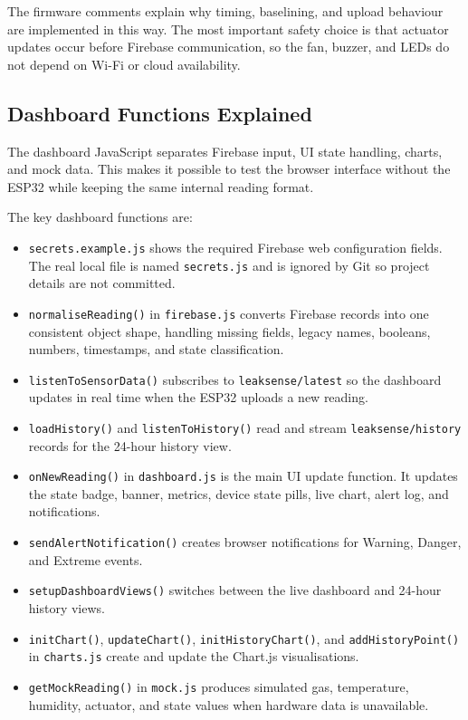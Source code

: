 \documentclass[a4paper,10pt,conference,onecolumn]{IEEEtran}
\begin{document}
The firmware comments explain why timing, baselining, and upload behaviour are
implemented in this way. The most important safety choice is that actuator
updates occur before Firebase communication, so the fan, buzzer, and LEDs do
not depend on Wi-Fi or cloud availability.

\subsection{Dashboard Functions Explained}

The dashboard JavaScript separates Firebase input, UI state handling, charts,
and mock data. This makes it possible to test the browser interface without
the ESP32 while keeping the same internal reading format.

The key dashboard functions are:
\begin{itemize}
  \item \texttt{secrets.example.js} shows the required Firebase web
        configuration fields. The real local file is named
        \texttt{secrets.js} and is ignored by Git so project details are not
        committed.
  \item \texttt{normaliseReading()} in \texttt{firebase.js} converts Firebase
        records into one consistent object shape, handling missing fields,
        legacy names, booleans, numbers, timestamps, and state classification.
  \item \texttt{listenToSensorData()} subscribes to
        \texttt{leaksense/latest} so the dashboard updates in real time when
        the ESP32 uploads a new reading.
  \item \texttt{loadHistory()} and \texttt{listenToHistory()} read and stream
        \texttt{leaksense/history} records for the 24-hour history view.
  \item \texttt{onNewReading()} in \texttt{dashboard.js} is the main UI update
        function. It updates the state badge, banner, metrics, device state
        pills, live chart, alert log, and notifications.
  \item \texttt{sendAlertNotification()} creates browser notifications for
        Warning, Danger, and Extreme events.
  \item \texttt{setupDashboardViews()} switches between the live dashboard and
        24-hour history views.
  \item \texttt{initChart()}, \texttt{updateChart()},
        \texttt{initHistoryChart()}, and \texttt{addHistoryPoint()} in
        \texttt{charts.js} create and update the Chart.js visualisations.
  \item \texttt{getMockReading()} in \texttt{mock.js} produces simulated gas,
        temperature, humidity, actuator, and state values when hardware data is
        unavailable.
\end{itemize}
\end{document}
